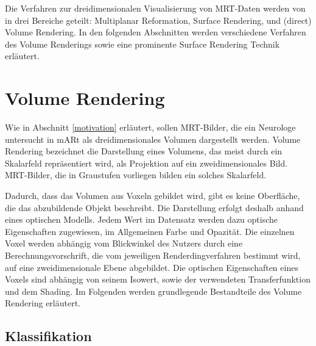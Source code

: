 Die Verfahren zur dreidimensionalen Visualisierung von MRT-Daten werden von \cite{Zhang10} in drei Bereiche geteilt: Multiplanar Reformation, Surface Rendering, und (direct) Volume Rendering. In den folgenden Abschnitten werden verschiedene Verfahren des Volume Renderings sowie eine prominente Surface Rendering Technik erläutert.

\section{Volume Rendering}							  %

Wie in Abschnitt \ref{motivation} erläutert, sollen MRT-Bilder, die ein Neurologe untersucht in mARt als dreidimensionales Volumen dargestellt werden. Volume Rendering bezeichnet die Darstellung eines Volumens, das meist durch ein Skalarfeld repräsentiert wird, als Projektion auf ein zweidimensionales Bild. MRT-Bilder, die in Graustufen vorliegen bilden ein solches Skalarfeld. 

Dadurch, dass das Volumen aus Voxeln gebildet wird, gibt es keine Oberfläche, die das abzubildende Objekt beschreibt. Die Darstellung erfolgt deshalb anhand eines optischen Modells. Jedem Wert im Datensatz werden dazu optische Eigenschaften zugewiesen, im Allgemeinen Farbe und Opazität. %
Die einzelnen Voxel werden abhängig vom Blickwinkel des Nutzers durch eine Berechnungsvorschrift, die vom jeweiligen Renderdingverfahren bestimmt wird, auf eine zweidimensionale Ebene abgebildet.
Die optischen Eigenschaften eines Voxels sind abhängig von seinem Isowert, sowie der verwendeten Transferfunktion und dem Shading. 
Im Folgenden werden grundlegende Bestandteile des Volume Rendering erläutert.%

\cite{Kaufman03}
\cite{kniss02}

\subsection{Klassifikation}
\label{klassifikation}

